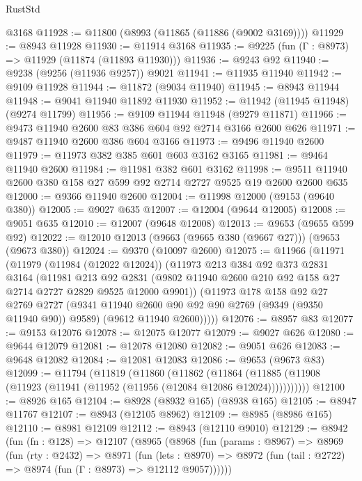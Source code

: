 \begin{lexlean}{RustStd}
\begin{coremodule}
    @3168
@11928 := @11800 (@8993 (@11865 (@11886 (@9002 @3169))))
@11929 := @8943 @11928
@11930 := @11914 @3168
@11935 := @9225 (fun (Γ : @8973) => @11929 (@11874 (@11893 @11930)))
@11936 := @9243 @92
@11940 := @9238 (@9256 (@11936 @9257)) @9021
@11941 := @11935 @11940
@11942 := @9109 @11928
@11944 := @11872 (@9034 @11940)
@11945 := @8943 @11944
@11948 := @9041 @11940 @11892 @11930
@11952 := @11942 (@11945 @11948) (@9274 @11799)
@11956 := @9109 @11944 @11948 (@9279 @11871)
@11966 := @9473 @11940 @2600 @83 @386 @604 @92 @2714 @3166 @2600 @626
@11971 := @9487 @11940 @2600 @386 @604 @3166
@11973 := @9496 @11940 @2600
@11979 := @11973 @382 @385 @601 @603 @3162 @3165
@11981 := @9464 @11940 @2600
@11984 := @11981 @382 @601 @3162
@11998 := @9511 @11940 @2600 @380 @158 @27 @599 @92 @2714 @2727 @9525 @19 @2600 @2600 @635
@12000 := @9366 @11940 @2600
@12004 := @11998 @12000 (@9153 (@9640 @380))
@12005 := @9027 @635
@12007 := @12004 (@9644 @12005)
@12008 := @9051 @635
@12010 := @12007 (@9648 @12008)
@12013 := @9653 (@9655 @599 @92)
@12022 := @12010 @12013 (@9663 (@9665 @380 (@9667 @27))) (@9653 (@9673 @380))
@12024 := @9370 (@10097 @2600)
@12075 := @11966
    (@11971
      (@11979
        (@11984 (@12022 @12024))
        (@11973
          @213
          @384
          @92
          @373
          @2831
          @3164
          (@11981
            @213
            @92
            @2831
            (@9802 @11940 @2600 @210 @92 @158 @27 @2714 @2727 @2829 @9525 @12000 @9901))
          (@11973
            @178
            @158
            @92
            @27
            @2769
            @2727
            (@9341 @11940 @2600 @90 @92 @90 @2769 (@9349 (@9350 @11940 @90)) @9589)
            (@9612 @11940 @2600)))))
@12076 := @8957 @83
@12077 := @9153 @12076
@12078 := @12075 @12077
@12079 := @9027 @626
@12080 := @9644 @12079
@12081 := @12078 @12080
@12082 := @9051 @626
@12083 := @9648 @12082
@12084 := @12081 @12083
@12086 := @9653 (@9673 @83)
@12099 := @11794
    (@11819
      (@11860
        (@11862
          (@11864 (@11885 (@11908 (@11923 (@11941 (@11952 (@11956 (@12084 @12086 @12024)))))))))))
@12100 := @8926 @165
@12104 := @8928 (@8932 @165) (@8938 @165)
@12105 := @8947 @11767
@12107 := @8943 (@12105 @8962)
@12109 := @8985 (@8986 @165)
@12110 := @8981 @12109
@12112 := @8943 (@12110 @9010)
@12129 := @8942
    (fun (fn : @128) =>
    @12107
      (@8965
        (@8968
          (fun (params : @8967) =>
          @8969
            (fun (rty : @2432) =>
            @8971
              (fun (lets : @8970) =>
              @8972 (fun (tail : @2722) => @8974 (fun (Γ : @8973) => @12112 @9057))))))

\end{coremodule}
\end{lexlean}

